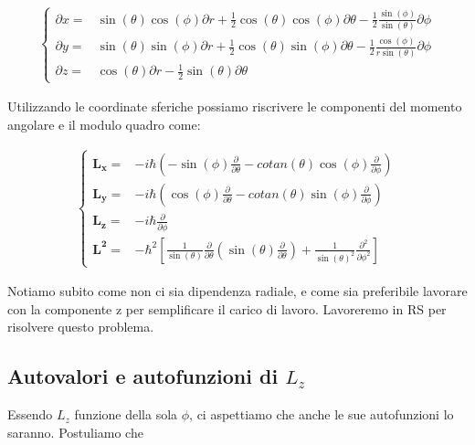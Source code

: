 \begin{align}
\left\{\begin{array}{ccc}
\partial x ={}& \sin(\theta)\cos(\phi) \partial r + \frac{1}{2} \cos(\theta)\cos(\phi) \partial \theta - \frac{1}{2}\frac{\sin(\phi)}{\sin(\theta)}\partial \phi \\
\partial y=& \sin(\theta)\sin(\phi) \partial r + \frac{1}{2} \cos(\theta)\sin(\phi) \partial \theta - \frac{1}{2}\frac{\cos(\phi)}{r\sin(\theta)}\partial \phi \\
\partial z=& \cos(\theta)\partial r - \frac{1}{2} \sin (\theta) \partial \theta \qquad\qquad\qquad\qquad\qquad\quad
\end{array}\right. 
\end{align}


Utilizzando le coordinate sferiche possiamo riscrivere le componenti del momento angolare e il modulo quadro come:

\begin{align}
\left\{\begin{array}{ccc}
\mathbf{L_x}={}&  -i \hbar \left(
-\sin(\phi)\frac{\partial}{\partial \theta} - cotan(\theta)\cos(\phi)\frac{\partial}{\partial \phi}
\right) \\
\mathbf{L_y}=&  -i \hbar \left(
\cos(\phi)\frac{\partial}{\partial \theta} - cotan(\theta)\sin(\phi)\frac{\partial}{\partial \phi}
\right)\;\;\; \\
\mathbf{L_z}=&  -i \hbar \frac{\partial}{\partial \phi} \qquad\qquad\qquad\qquad\qquad\qquad\;\;\;\;\;\; \\
\mathbf{L^2}=& - \hbar^2 \left[\frac{1}{\sin(\theta)}\frac{\partial}{\partial \theta}\left(\sin(\theta)\frac{\partial}{\partial \theta}\right) + \frac{1}{\sin(\theta)^2}\frac{\partial^2}{\partial \phi^2} 
\right]
\end{array}\right. 
\end{align}

Notiamo subito come non ci sia dipendenza radiale, e come sia preferibile lavorare con la componente z per semplificare il carico di lavoro. Lavoreremo in RS per risolvere questo problema. \newpage


\subsection{Autovalori e autofunzioni di $L_z$}

Essendo $L_z$ funzione della sola $\phi$, ci aspettiamo che anche le sue autofunzioni lo saranno. Postuliamo che

